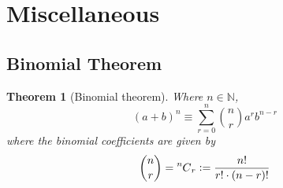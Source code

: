 \documentclass[fleqn,a4paper,11pt]{article}
\newcommand{\defeq}{\vcentcolon=}
\newcommand*\nCr[2]{\prescript{#1\mkern-0.5mu}{}C_{#2}}
\newcommand{\setstyle}{\mathbb}
\newcommand{\Naturals}{\setstyle N}
\newtheorem{theorem}{Theorem}[section]
\begin{document}
    \section{Miscellaneous}

    \subsection{Binomial Theorem}

    \begin{theorem}[Binomial theorem] Where \(n \in \Naturals\),
    \begin{equation*}
    (a + b)^n \equiv \sum_{r = 0}^n \binom nr a^r b^{n - r}
    \end{equation*}
    where the binomial coefficients are given by
    \begin{equation*}
    \binom nr = \nCr nr \defeq \frac{n!}{r!\cdot(n - r)!}
    \end{equation*}
    \end{theorem}
\end{document}
